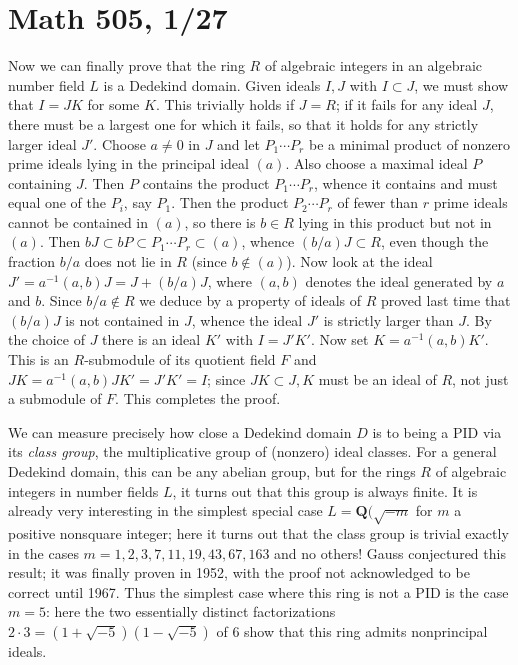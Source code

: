 \documentclass[10pt]{article}
\begin{document}
\section*{Math 505, 1/27}

Now we can finally prove that the ring $R$ of algebraic integers in an
algebraic number field $L$ is a Dedekind domain. Given ideals $I,J$ with
$I\subset J$, we must show that $I=JK$ for some $K$. This trivially
holds if $J=R$; if it fails for any ideal $J$, there must be a largest
one for which it fails, so that it holds for any strictly larger ideal
$J'$. Choose $a\ne0$ in $J$ and let $P_1\cdots P_r$ be a minimal product
of nonzero prime ideals lying in the principal ideal $(a)$. Also choose
a maximal ideal $P$ containing $J$. Then $P$ contains the product
$P_1\cdots P_r$, whence it contains and must equal one of the $P_i$, say
$P_1$. Then the product $P_2\cdots P_r$ of fewer than $r$ prime ideals
cannot be contained in $(a)$, so there is $b\in R$ lying in this product
but not in $(a)$. Then $bJ\subset bP\subset P_1\cdots P_r\subset (a)$,
whence $(b/a)J\subset R$, even though the fraction $b/a$ does not lie in
$R$ (since $b\notin (a)$). Now look at the ideal $J' = a^{-1}(a,b)J = J
+ (b/a)J$, where $(a,b)$ denotes the ideal generated by $a$ and $b$.
Since $b/a\notin R$ we deduce by a property of ideals of $R$ proved last
time that $(b/a)J$ is not contained in $J$, whence the ideal $J'$ is
strictly larger than $J$. By the choice of $J$ there is an ideal $K'$
with $I=J'K'$. Now set $K= a^{-1}(a,b)K'$. This is an $R$-submodule of
its quotient field $F$ and $JK = a^{-1}(a,b)JK' = J'K' = I$; since
$JK\subset J, K$ must be an ideal of $R$, not just a submodule of $F$.
This completes the proof.

We can measure precisely how close a Dedekind domain $D$ is to being a
PID via its {\sl class group}, the multiplicative group of (nonzero)
ideal classes. For a general Dedekind domain, this can be any abelian
group, but for the rings $R$ of algebraic integers in number fields $L$,
it turns out that this group is always finite. It is already very
interesting in the simplest special case $L=\mathbf Q(\sqrt{-m}$ for $m$
a positive nonsquare integer; here it turns out that the class group is
trivial exactly in the cases $m = 1,2,3,7,11,19,43,67,163$ and no
others! Gauss conjectured this result; it was finally proven in 1952,
with the proof not acknowledged to be correct until 1967. Thus the
simplest case where this ring is not a PID is the case $m=5$: here the
two essentially distinct factorizations $2\cdot 3 =
(1+\sqrt{-5})(1-\sqrt{-5})$ of 6 show that this ring admits nonprincipal
ideals.
\end{document}
